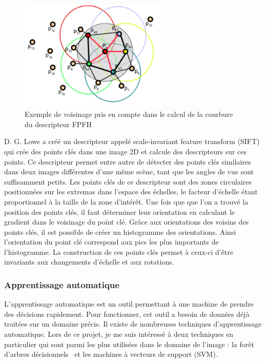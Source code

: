 \begin{figure}[!ht]
  \begin{center}
    \includegraphics[width=7cm]{image/FPFH.png}
    \caption{Exemple de voisinage pris en compte dans le calcul de la courbure du descripteur FPFH}
    \label{fig:fpfhNeighborhood}
  \end{center}
\end{figure}

D. G. Lowe\cite{SIFT} a créé un descripteur appelé \og scale-invariant feature transform \fg(SIFT) qui crée
des points clés dans une image 2D et calcule des descripteurs sur ces points. Ce descripteur permet entre autre
de détecter des points clés similaires dans deux images différentes d'une même scène, tant que les angles de vue
sont suffisamment petits. Les points clés de ce descripteur sont des zones circulaires positionnées sur les extremas 
dans l'espace des échelles, le facteur d'échelle étant proportionnel à la taille de la zone d'intérêt. Une fois que
que l'on a trouvé la position des points clés, il faut déterminer leur orientation en calculant le gradient dans le voisinage
du point clé. Grâce aux orientations des voisins des points clés, il est possible de créer un histogramme des orientations. Ainsi
l'orientation du point clé correspond aux pics les plus importants de l'histogramme.
La construction de ces points clés permet à ceux-ci d'être invariants aux changements d'échelle et aux rotations.

\subsubsection{Apprentissage automatique}
L'apprentissage automatique est un outil permettant à une machine de prendre des décisions rapidement.
Pour fonctionner, cet outil a besoin de données déjà traitées sur un domaine précis. Il existe de nombreuses
techniques d'apprentissage automatique. Lors de ce projet, je me suis intéressé à deux techniques en 
particulier qui sont parmi les plus utilisées dans le domaine de l'image : la \og forêt d'arbres décisionnels \fg \ et les
\og machines à vecteurs de support \fg (SVM).\\

